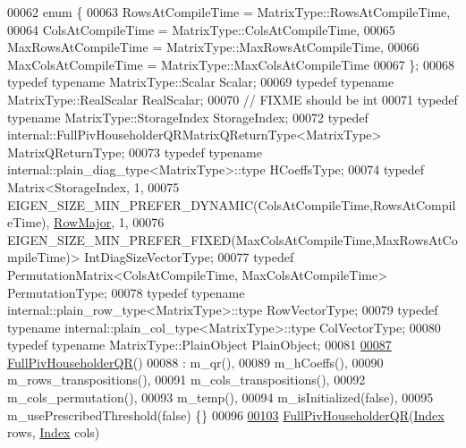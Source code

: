 \begin{DoxyCode}
00062     \textcolor{keyword}{enum} \{
00063       RowsAtCompileTime = MatrixType::RowsAtCompileTime,
00064       ColsAtCompileTime = MatrixType::ColsAtCompileTime,
00065       MaxRowsAtCompileTime = MatrixType::MaxRowsAtCompileTime,
00066       MaxColsAtCompileTime = MatrixType::MaxColsAtCompileTime
00067     \};
00068     \textcolor{keyword}{typedef} \textcolor{keyword}{typename} MatrixType::Scalar Scalar;
00069     \textcolor{keyword}{typedef} \textcolor{keyword}{typename} MatrixType::RealScalar RealScalar;
00070     \textcolor{comment}{// FIXME should be int}
00071     \textcolor{keyword}{typedef} \textcolor{keyword}{typename} MatrixType::StorageIndex StorageIndex;
00072     \textcolor{keyword}{typedef} internal::FullPivHouseholderQRMatrixQReturnType<MatrixType> MatrixQReturnType;
00073     \textcolor{keyword}{typedef} \textcolor{keyword}{typename} internal::plain\_diag\_type<MatrixType>::type HCoeffsType;
00074     \textcolor{keyword}{typedef} Matrix<StorageIndex, 1,
00075                    EIGEN\_SIZE\_MIN\_PREFER\_DYNAMIC(ColsAtCompileTime,RowsAtCompileTime), 
      \hyperlink{group__enums_ggaacded1a18ae58b0f554751f6cdf9eb13acfcde9cd8677c5f7caf6bd603666aae3}{RowMajor}, 1,
00076                    EIGEN\_SIZE\_MIN\_PREFER\_FIXED(MaxColsAtCompileTime,MaxRowsAtCompileTime)> 
      IntDiagSizeVectorType;
00077     \textcolor{keyword}{typedef} PermutationMatrix<ColsAtCompileTime, MaxColsAtCompileTime> PermutationType;
00078     \textcolor{keyword}{typedef} \textcolor{keyword}{typename} internal::plain\_row\_type<MatrixType>::type RowVectorType;
00079     \textcolor{keyword}{typedef} \textcolor{keyword}{typename} internal::plain\_col\_type<MatrixType>::type ColVectorType;
00080     \textcolor{keyword}{typedef} \textcolor{keyword}{typename} MatrixType::PlainObject PlainObject;
00081 
\hyperlink{group___q_r___module_aeb14b4c1eef33128207b40a00bd0bd08}{00087}     \hyperlink{group___q_r___module_aeb14b4c1eef33128207b40a00bd0bd08}{FullPivHouseholderQR}()
00088       : m\_qr(),
00089         m\_hCoeffs(),
00090         m\_rows\_transpositions(),
00091         m\_cols\_transpositions(),
00092         m\_cols\_permutation(),
00093         m\_temp(),
00094         m\_isInitialized(false),
00095         m\_usePrescribedThreshold(false) \{\}
00096 
\hyperlink{group___q_r___module_abf722e1dc7241a5d6f76460ef0c87821}{00103}     \hyperlink{group___q_r___module_abf722e1dc7241a5d6f76460ef0c87821}{FullPivHouseholderQR}(\hyperlink{namespace_eigen_a62e77e0933482dafde8fe197d9a2cfde}{Index} rows, \hyperlink{namespace_eigen_a62e77e0933482dafde8fe197d9a2cfde}{Index} cols)

\end{DoxyCode}
